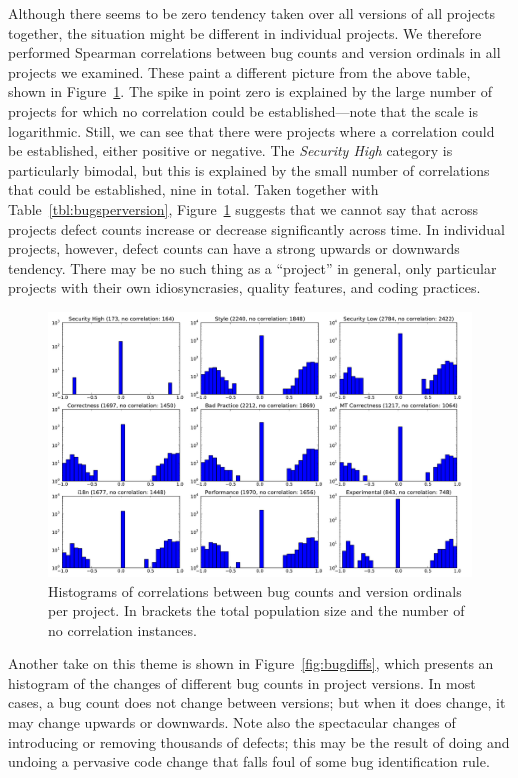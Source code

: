 \documentclass[conference]{llncs}
\begin{document}
Although there seems to be zero tendency taken over all versions of
all projects together, the situation might be different in individual
projects. We therefore performed Spearman correlations between bug
counts and version ordinals in all projects we examined. These paint a
different picture from the above table, shown in
Figure~\ref{fig:bugsversionscorr}. The spike in point zero is
explained by the large number of projects for which no correlation
could be established---note that the scale is logarithmic. Still, we
can see that there were projects where a correlation could be
established, either positive or negative. The {\it Security High}
category is particularly bimodal, but this is explained by the small
number of correlations that could be established, nine in total. Taken
together with Table~\ref{tbl:bugsperversion},
Figure~\ref{fig:bugsversionscorr} suggests that we cannot say that across
projects defect counts increase or decrease significantly across time.
In individual projects, however, defect counts can have a strong
upwards or downwards tendency. There may be no such thing as a
``project'' in general, only particular projects with their own
idiosyncrasies, quality features, and coding practices.

\begin{figure}
  \centering
  \includegraphics[scale=0.4]{bugsversionscorr}
  \caption{Histograms of correlations between bug counts and version
    ordinals per project. In brackets the total population size and
    the number of no correlation instances.}
  \label{fig:bugsversionscorr}
\end{figure}

Another take on this theme is shown in Figure~\ref{fig:bugdiffs},
which presents an histogram of the changes of different bug counts in
project versions. In most cases, a bug count does not change between
versions; but when it does change, it may change upwards or downwards.
Note also the spectacular changes of introducing or removing thousands
of defects; this may be the result of doing and undoing a pervasive
code change that falls foul of some bug identification rule.
\end{document}
